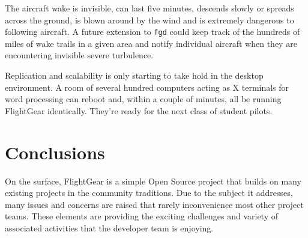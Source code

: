 \documentclass[a4paper,10pt]{article}
\begin{document}
The aircraft wake is invisible, can last five minutes, descends slowly
or spreads across the ground, is blown around by the wind and is 
extremely dangerous to following aircraft.  A future extension to 
{\tt fgd} could keep track of the hundreds of miles of wake trails
in a given area and notify individual aircraft when they are encountering
invisible severe turbulence.

Replication and scalability is only starting to take hold in the
desktop environment.  A room of several hundred computers acting
as X terminals for word processing can reboot and, 
within a couple of minutes, all be running
FlightGear identically.  They're ready for the next class of student pilots.
%
%
\section*{Conclusions}
%
On the surface, FlightGear is a simple Open Source project that
builds on many existing projects in the community traditions.
Due to the subject it addresses, many issues and concerns
are raised that rarely inconvenience most other project teams.
These elements are providing the exciting challenges and variety
of associated activities that the developer team is enjoying.
\end{document}
